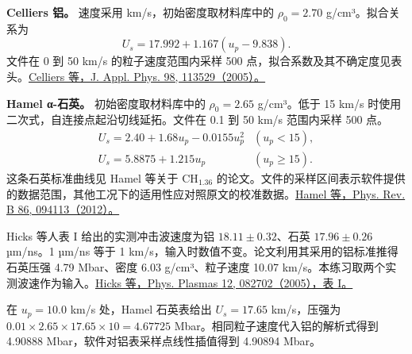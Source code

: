 \textbf{Celliers 铝。} 速度采用 km/s，初始密度取材料库中的 $\rho_0=2.70$ g/cm³。拟合关系为
\[
 U_s=17.992+1.167(u_p-9.838).
\]
文件在 0 到 50 km/s 的粒子速度范围内采样 500 点，拟合系数及其不确定度见表头。\href{https://doi.org/10.1063/1.2140077}{Celliers 等，J. Appl. Phys. 98, 113529（2005）。}

\textbf{Hamel α-石英。} 初始密度取材料库中的 $\rho_0=2.65$ g/cm³。低于 15 km/s 时使用二次式，自连接点起沿切线延拓。文件在 0.1 到 50 km/s 范围内采样 500 点。
\[
\begin{array}{ll}
U_s=2.40+1.68u_p-0.0155u_p^2 & (u_p<15),\\
U_s=5.8875+1.215u_p & (u_p\geq15).
\end{array}
\]
这条石英标准曲线见 Hamel 等关于 CH$_{1.36}$ 的论文。文件的采样区间表示软件提供的数据范围，其他工况下的适用性应对照原文的校准数据。\href{https://doi.org/10.1103/PhysRevB.86.094113}{Hamel 等，Phys. Rev. B 86, 094113（2012）。}

Hicks 等人表 I 给出的实测冲击波速度为铝 $18.11\pm0.32$、石英 $17.96\pm0.26$ µm/ns。1 µm/ns 等于 1 km/s，输入时数值不变。论文利用其采用的铝标准推得石英压强 4.79 Mbar、密度 6.03 g/cm³、粒子速度 10.07 km/s。本练习取两个实测波速作为输入。\href{https://doi.org/10.1063/1.2009528}{Hicks 等，Phys. Plasmas 12, 082702（2005），表 I。}

在 $u_p=10.0$ km/s 处，Hamel 石英表给出 $U_s=17.65$ km/s，压强为 $0.01\times2.65\times17.65\times10=4.67725$ Mbar。相同粒子速度代入铝的解析式得到 4.90888 Mbar，软件对铝表采样点线性插值得到 4.90894 Mbar。
